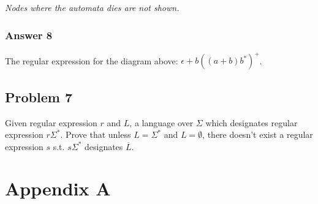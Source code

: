 \documentclass[11pt]{article}
\begin{document}

\emph{Nodes where the automata dies are not shown.}

\subsubsection{Answer 8}
\label{sec:orgheadline14}
The regular expression for the diagram above: \(\epsilon + b((a + b)b^*)^+\).

\subsection{Problem 7}
\label{sec:orgheadline16}
Given regular expression \(r\) and \(L\), a language over \(\Sigma\) which
designates regular expression \(r\Sigma^*\).  Prove that unless \(L = \Sigma^*\)
and \(L = \emptyset\), there doesn't exist a regular expression \(s\) s.t.
\(s\Sigma^*\) designates \(\overline{L}\).
\section{Appendix A}
\label{sec:orgheadline18}

\end{document}
